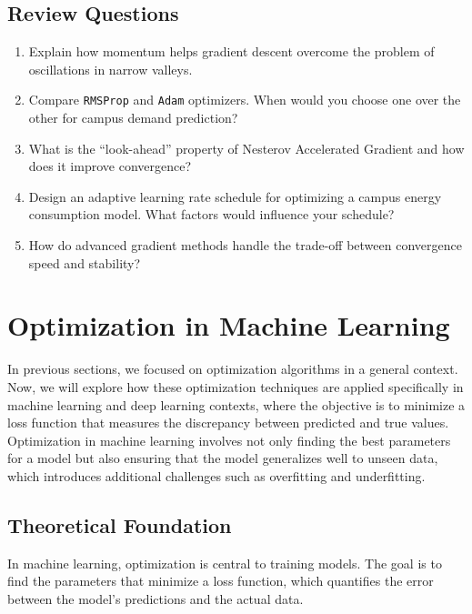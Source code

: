 \documentclass[
  letterpaper,
  DIV=11,
  numbers=noendperiod]{scrreprt}
\begin{document}
\subsection{Review Questions}\label{review-questions-17}

\begin{enumerate}
\def\labelenumi{\arabic{enumi}.}
\item
  Explain how momentum helps gradient descent overcome the problem of
  oscillations in narrow valleys.
\item
  Compare \texttt{RMSProp} and \texttt{Adam} optimizers. When would you
  choose one over the other for campus demand prediction?
\item
  What is the ``look-ahead'' property of Nesterov Accelerated Gradient
  and how does it improve convergence?
\item
  Design an adaptive learning rate schedule for optimizing a campus
  energy consumption model. What factors would influence your schedule?
\item
  How do advanced gradient methods handle the trade-off between
  convergence speed and stability?
\end{enumerate}

\section{Optimization in Machine
Learning}\label{optimization-in-machine-learning}

In previous sections, we focused on optimization algorithms in a general
context. Now, we will explore how these optimization techniques are
applied specifically in machine learning and deep learning contexts,
where the objective is to minimize a loss function that measures the
discrepancy between predicted and true values. Optimization in machine
learning involves not only finding the best parameters for a model but
also ensuring that the model generalizes well to unseen data, which
introduces additional challenges such as overfitting and underfitting.

\subsection{Theoretical Foundation}\label{theoretical-foundation-12}

In machine learning, optimization is central to training models. The
goal is to find the parameters that minimize a loss function, which
quantifies the error between the model's predictions and the actual
data.
\end{document}
